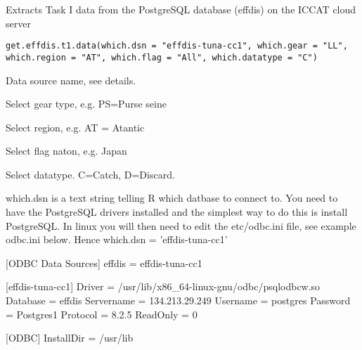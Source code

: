 \documentclass[letterpaper]{book}
\begin{document}
%
\begin{Description}\relax
Extracts Task I data from the PostgreSQL database (effdis) on the ICCAT cloud server
\end{Description}
%
\begin{Usage}
\begin{verbatim}
get.effdis.t1.data(which.dsn = "effdis-tuna-cc1", which.gear = "LL", which.region = "AT", which.flag = "All", which.datatype = "C")
\end{verbatim}
\end{Usage}
%
\begin{Arguments}
\begin{ldescription}
\item[\code{which.dsn}] 
Data source name, see details.

\item[\code{which.gear}] 
Select gear type, e.g. PS=Purse seine

\item[\code{which.region}] 
Select region, e.g. AT = Atantic

\item[\code{which.flag}] 
Select flag naton, e.g. Japan

\item[\code{which.datatype}] 
Select datatype. C=Catch, D=Discard.

\end{ldescription}
\end{Arguments}
%
\begin{Details}\relax
which.dsn is a text string telling R which datbase to connect to. You need to have the PostgreSQL drivers installed and the simplest way to do this is install PostgreSQL. In linux you will then need to edit the 
etc/odbc.ini file, see example odbc.ini below. Hence which.dsn = 'effdis-tuna-cc1'

[ODBC Data Sources]
effdis = effdis-tuna-cc1

[effdis-tuna-cc1]
Driver = /usr/lib/x86\_64-linux-gnu/odbc/psqlodbcw.so
Database = effdis
Servername = 134.213.29.249
Username = postgres
Password = Postgres1
Protocol = 8.2.5
ReadOnly = 0

[ODBC]
InstallDir = /usr/lib

\end{Details}
\end{document}
